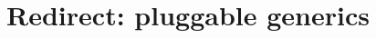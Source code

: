 \documentclass[a4paper,twoside,british,9pt]{extarticle}
\begin{document}
\title{Redirect: pluggable generics}
\date{}
\maketitle
\vspace{-10ex}




\end{document}
